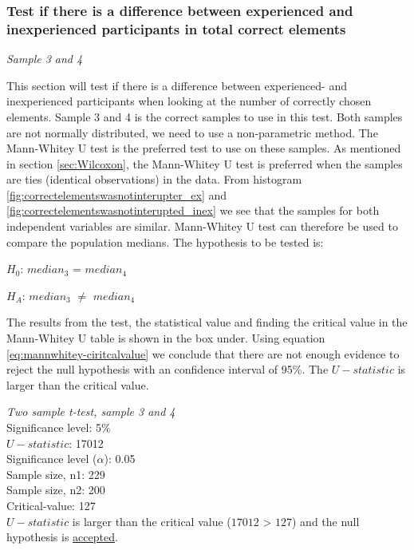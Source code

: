 \subsubsection[Sample 3, 4]{Test if there is a difference between experienced and inexperienced participants in total correct elements} %

\textit{Sample 3 and 4}\newline

This section will test if there is a difference between experienced- and inexperienced participants when looking at the number of correctly chosen elements. Sample 3 and 4 is the correct samples to use in this test. Both samples are not normally distributed, we need to use a non-parametric method. The Mann-Whitey U test is the preferred test to use on these samples. As mentioned in section \ref{sec:Wilcoxon}, the Mann-Whitey U test is preferred when the samples are ties (identical observations) in the data. From histogram \ref{fig:correctelementswasnotinterupter_ex} and \ref{fig:correctelementswasnotinterupted_inex} we see that the samples for both independent variables are similar. Mann-Whitey U test can therefore be used to compare the population medians. The hypothesis to be tested is:\\[0.3cm]

\centerline{$H_{0}$: $median_3$ = $median_4$}
\centerline{$H_{A}$: $median_3$ $\neq$ $median_4$}

The results from the test, the statistical value and finding the critical value in the Mann-Whitey U table is shown in the box under. Using equation \ref{eq:mannwhitey-ciritcalvalue} we conclude that there are not enough evidence to reject the null hypothesis with an confidence interval of 95\%. The $U-statistic$ is larger than the critical value. 

 \begin{center}
	\begin{tcolorbox}[box align=center,width=\textwidth-5cm]
		\centering
		\textit{Two sample t-test, sample 3 and 4}\\
		Significance level: 5\%  \\[0.5cm]
		
		$U-statistic$: 17012 \\
		Significance level ($\alpha$): 0.05 \\
		Sample size, n1:  229\\
		Sample size, n2: 200\\
		Critical-value: 127 \\[0.2cm] %
		
		$U-statistic$ is larger than the critical value ($17012$ > $127$) and the null hypothesis is \underline{accepted}.\\[0.5cm]
	\end{tcolorbox} 
\end{center}

